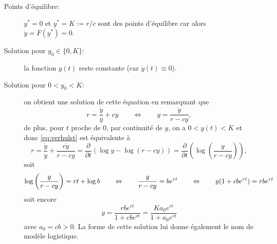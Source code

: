 \begin{description}
  \item[Points d'équilibre:] $y^* = 0$ et $y^* = K := r/c$ sont des points d'équilibre car alors $\dot y = F(y^*) = 0$.
  \item[Solution pour $y_0 \in \{0, K\}$:] la fonction $y(t)$ reste constante (car $\dot y(t) \equiv 0$).
  \item[Solution pour $0 < y_0 < K$:] on obtient une solution de cette équation en remarquant que
  $$
  r = \frac{\dot y}y + cy \qquad \Leftrightarrow \qquad y = \frac{\dot y}{r - cy},
  $$
  de plus, pour $t$ proche de 0, par continuité de $y$, on a $0 < y(t) < K$ et donc \eqref{eq:verhulst} est équivalente à 
  \begin{equation} \label{eq:verhulstSolution}
  r 
  = \frac{\dot y}{y} + \frac{c \dot y}{r - cy}
  = \frac{\partial}{\partial t} \left(\log y - \log (r - cy) \right)
  = \frac{\partial}{\partial t} \left(\log \left(\frac{y}{r - cy}\right)\right),
  \end{equation}
  soit
  $$  \log \left(\frac{y}{r - cy}\right) = rt + \log b
  \qquad \Leftrightarrow \qquad 
  \frac{y}{r - cy} = b e^{rt}
  \qquad \Leftrightarrow \qquad
  y(1 + c b e^{rt}) = r b e^{rt} \\
  $$
  soit encore
  \begin{equation} \label{eq:solutionVerhulst}
    y = \frac{rb e^{rt}}{1 + cb e^{rt}} = \frac{K a_0 e^{rt}}{1 + a_0 e^{rt}}
  \end{equation}
  avec $a_0 = cb > 0$.
  La forme de cette solution lui donne également le nom de modèle logistique. 
  

\end{description}
